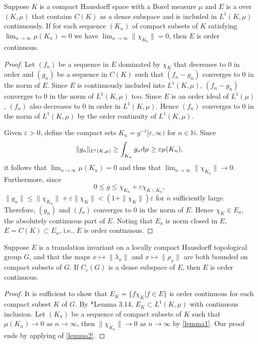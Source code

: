 \begin{lemma}\label{lemma2}
	Suppose $K$ is a compact Hausdorff space with a Borel measure $\mu$ and $E$ is a \bfs over $(K,\mu)$ that contains $C(K)$ as a dense subspace and is included in $ L^1(K,\mu)$ continuously. If for each sequence $(K_n)$ of compact subsets of $K$ satisfying $\lim_{n\to\infty}\mu(K_n)=0$ we have $\lim_{n\to\infty}\|\chi_{K_n}\|=0$, then $E$ is order continuous.
\end{lemma}
\begin{proof} 
	Let $(f_n)$ be a sequence in $E$ dominated by $\chi_K$ that decreases to $0$ in order  and $(g_n)$ be a sequence in $C(K)$ such that $(f_n-g_n)$ converges to $0$ in the norm of $E$. Since $E$ is continuously included into $L^1(K,\mu)$, $(f_n-g_n)$ converges to $0$ in the norm of $L^1(K,\mu)$ too.  Since $E$ is an order ideal of $L^1(\mu)$, $(f_n)$ also decreases to $0$ in order in $L^1(K,\mu)$.  Hence $(f_n)$ converges to $0$ in the norm of $L^1(K,\mu)$ by the order continuity of $L^1(K,\mu)$. 

Given $\varepsilon>0$, define the compact sets $K_n=g^{-1}[\varepsilon,\infty)$ for $n\in \mathbb{N}$. Since $$\|g_n\|_{L^1(K,\mu)}\geq \int_{K_n} g_n{\mathrm d}\mu\geq \varepsilon \mu(K_n),$$ it follows that $\lim_{n\to \infty}\mu(K_n)=0$ and thus that $\lim_{n\to\infty}\|\chi_{K_n}\|\to 0$. Furthermore, since $$0\leq g\leq \chi_{K_n}+\varepsilon \chi_{K\backslash K_n},$$ $\|g_n\|\leq \|\chi_{K_n}\|+\varepsilon \|\chi_K\|<(1+\|\chi_K\|)\varepsilon$ for $n$ sufficiently large. Therefore, $(g_n)$ and $(f_n)$ converges to $0$ in the norm of $E$. Hence $\chi_K\in E_a$, the absolutely continuous part of $E$. Noting that $E_a$ is norm closed in $E$, $E=\overline{C(K)}\subset E_a$, i.e., $E$ is order continuous.
\end{proof}


\begin{theorem}
 Suppose $E$ is a translation invariant \bfs on a locally compact Hausdorff topological group $G$, and that the maps $x\mapsto \|\lambda_x\|$ and $x\mapsto\|\rho_x\|$ are both  bounded on compact subsets of $G$. If $C_c(G)$ is a dense subspace of $E$, then $E$ is order continuous.	
\end{theorem}

\begin{proof} It is sufficient to show that  $E_K=\{f\chi_K |f\in E\}$ is order continuous for each compact subset $K$ of $G$. By \cite{David}*{Lemma 3.14}, $E_K\subset L^1(K,\mu)$ with continuous inclusion. Let $(K_n)$ be a sequence of compact subsets of $K$ such that $\mu(K_n)\to 0$ as $n\to \infty$, then $\|\chi_{K_n}\|\to 0$ as $n\to \infty$ by \cref{lemma1}. Our proof ends by applying of \cref{lemma2}.
\end{proof}



